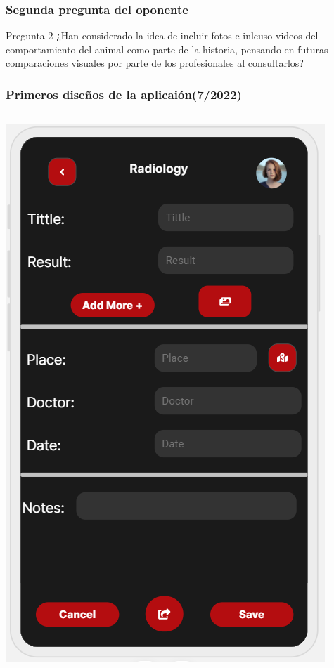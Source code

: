 \documentclass[14pt]{beamer}
\begin{document}
\begin{frame}
\frametitle{Segunda pregunta del oponente}
\begin{block}{Pregunta 2}
¿Han considerado la idea de incluir fotos e inlcuso videos del comportamiento del animal como parte de la historia, pensando en futuras comparaciones visuales por parte de los profesionales al consultarlos?
\end{block}
\end{frame}




\begin{frame}
\frametitle{Primeros diseños de la aplicaión(7/2022)}


\begin{columns}
\begin{column}{0.5\textwidth}
\begin{center}

\includegraphics[scale = 0.35]{Images/photoExample.png}


\end{center}
\end{column}
\end{columns}
\end{frame}
\end{document}
